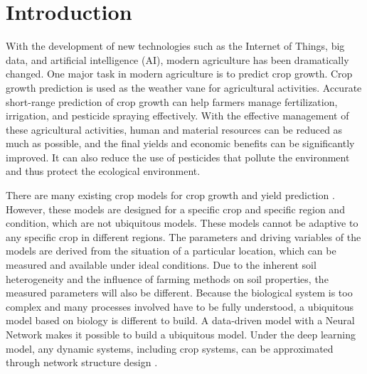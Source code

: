 \documentclass[acmsmall, screen]{acmart}
\begin{document}
\section{Introduction}
With the development of new technologies such as the Internet of Things, big data, and artificial intelligence (AI), modern agriculture has been dramatically changed. One major task in modern agriculture is to predict crop growth. Crop growth prediction is used as the weather vane for agricultural activities. Accurate short-range prediction of crop growth can help farmers manage fertilization, irrigation, and pesticide spraying effectively. With the effective management of these agricultural activities, human and material resources can be reduced as much as possible, and the final yields and economic benefits can be significantly improved. It can also reduce the use of pesticides that pollute the environment and thus protect the ecological environment.

There are many existing crop models for crop growth and yield prediction \cite{book,BRISSON2003309,boogaard1998wofost}. However, these models are designed for a specific crop and specific region and condition, which are not ubiquitous models. These models cannot be adaptive to any specific crop in different regions. The parameters and driving variables of the models are derived from the situation of a particular location, which can be measured and available under ideal conditions. Due to the inherent soil heterogeneity and the influence of farming methods on soil properties, the measured parameters will also be different. Because the biological system is too complex and many processes involved have to be fully understood, a ubiquitous model based on biology is different to build. A data-driven model with a Neural Network makes it possible to build a ubiquitous model. Under the deep learning model, any dynamic systems, including crop systems, can be approximated through network structure design \cite{lecun_deep_2015,2020Deep}.
\end{document}
